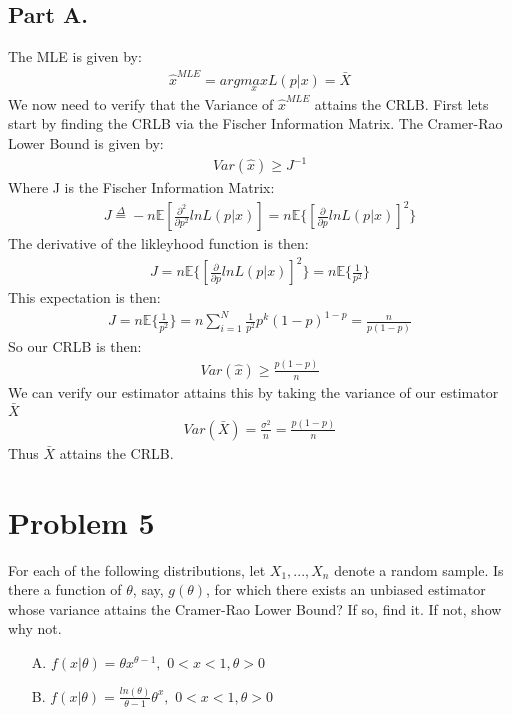 \documentclass{article}
\begin{document}
\subsection*{Part A.}
The MLE is given by:
\begin{align*}
\hat{x}^{MLE} = arg \underset{x}{max} L(p|x) = \bar{X}
\end{align*}
We now need to verify that the Variance of $\hat{x}^{MLE}$ attains the CRLB. First lets start by finding the CRLB via the Fischer Information Matrix. The Cramer-Rao Lower Bound is given by:
\begin{align*}
Var(\hat{x}) \geq J^{-1}
\end{align*}
Where J is the Fischer Information Matrix:
\begin{align*}
J \overset{\Delta}{=} -n \mathbb{E}[ \frac{\partial^2}{\partial p^2} ln L(p|x)] = n \mathbb{E}\{[ \frac{\partial}{\partial p} ln L(p|x)]^2 \}
\end{align*}
The derivative of the likleyhood function is then:
\begin{align*}
J = n \mathbb{E}\{[ \frac{\partial}{\partial p} ln L(p|x)]^2 \} = n \mathbb{E}\{ \frac{1}{p^2} \}
\end{align*}
This expectation is then:
\begin{align*}
J = n \mathbb{E}\{ \frac{1}{p^2} \} = n \sum_{i=1}^{N} \frac{1}{p^2} p^k (1-p)^{1-p} = \frac{n}{p(1-p)}
\end{align*}
So our CRLB is then:
\begin{align*}
Var(\hat{x}) \geq \frac{p(1-p)}{n}
\end{align*}
We can verify our estimator attains this by taking the variance of our estimator $\bar{X}$
\begin{align*}
\boxed{ Var(\bar{X}) = \frac{\sigma^2}{n} = \frac{p(1-p)}{n} }
\end{align*}
Thus $\bar{X}$ attains the CRLB.
\clearpage

\section*{Problem 5}
For each of the following distributions, let $X_1,...,X_n$ denote a random sample. Is there a function of $\theta$, say, $g(\theta)$, for which there exists an unbiased estimator whose variance attains the Cramer-Rao Lower Bound? If so, find it. If not, show why not.
\begin{enumerate}
\item[A.] $f(x|\theta) = \theta x^{\theta-1},$  $ 0<x<1, \theta>0$
\item[B.] $f(x|\theta) = \frac{ln(\theta)}{\theta-1} \theta^x ,$  $ 0<x<1, \theta>0$
\end{enumerate}
\end{document}
